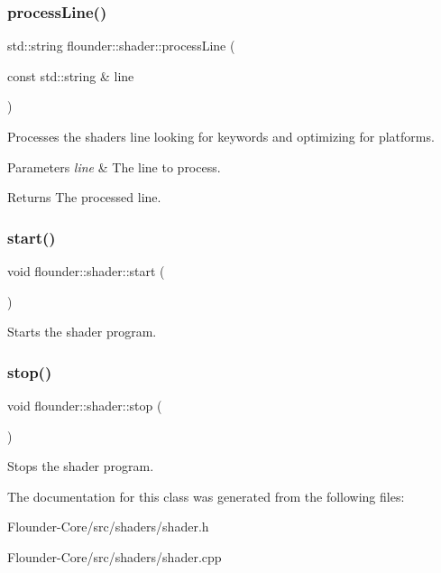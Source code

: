 \subsubsection{\texorpdfstring{process\+Line()}{processLine()}}
{\footnotesize\ttfamily std\+::string flounder\+::shader\+::process\+Line (\begin{DoxyParamCaption}\item[{const std\+::string \&}]{line }\end{DoxyParamCaption})\hspace{0.3cm}{\ttfamily [private]}}



Processes the shaders line looking for keywords and optimizing for platforms. 


\begin{DoxyParams}{Parameters}
{\em line} & The line to process. \\
\hline
\end{DoxyParams}
\begin{DoxyReturn}{Returns}
The processed line. 
\end{DoxyReturn}
\mbox{\label{classflounder_1_1shader_a4b1f6770ce28db4f9a4b20e0842d785e}} 
\subsubsection{\texorpdfstring{start()}{start()}}
{\footnotesize\ttfamily void flounder\+::shader\+::start (\begin{DoxyParamCaption}{ }\end{DoxyParamCaption})}



Starts the shader program. 

\mbox{\label{classflounder_1_1shader_a2972bda7e96b86de9a12a44e3e285691}} 
\subsubsection{\texorpdfstring{stop()}{stop()}}
{\footnotesize\ttfamily void flounder\+::shader\+::stop (\begin{DoxyParamCaption}{ }\end{DoxyParamCaption})}



Stops the shader program. 



The documentation for this class was generated from the following files\+:\begin{DoxyCompactItemize}
\item 
Flounder-\/\+Core/src/shaders/shader.\+h\item 
Flounder-\/\+Core/src/shaders/shader.\+cpp\end{DoxyCompactItemize}
